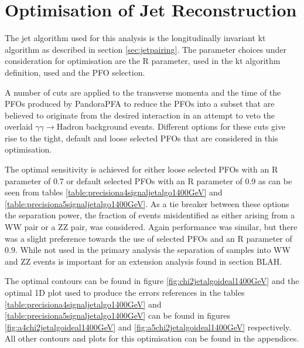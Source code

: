 \section{Optimisation of Jet Reconstruction} \label{sec:optimisationjetalgo}
The jet algorithm used for this analysis is the longitudinally invariant kt algorithm as described in section \ref{sec:jetpairing}.  The parameter choices under consideration for optimisation are the R parameter, used in the kt algorithm definition, used and the PFO selection.  

A number of cuts \cite{arXiv:1209.4039} are applied to the transverse momenta and the time of the PFOs produced by PandoraPFA to reduce the PFOs into a subset that are believed to originate from the desired interaction in an attempt to veto the overlaid $\gamma\gamma \rightarrow \text{Hadron}$ background events.  Different options for these cuts  give rise to the tight, default and loose selected PFOs that are considered in this optimisation.  

The optimal sensitivity is achieved for either loose selected PFOs with an R parameter of 0.7 or default selected PFOs with an R parameter of 0.9 as can be seen from tables \ref{table:precisiona4signaljetalgo1400GeV} and \ref{table:precisiona5signaljetalgo1400GeV}.  As a tie breaker between these options the separation power, the fraction of events misidentified as either arising from a WW pair or a ZZ pair, was considered.  Again performance was similar, but there was a slight preference towards the use of selected PFOs and an R parameter of 0.9.  While not used in the primary analysis the separation of samples into WW and ZZ events is important for an extension analysis found in section BLAH.

The optimal contours can be found in figure \ref{fig:chi2jetalgoideal1400GeV} and the optimal 1D plot used to produce the errors references in the tables \ref{table:precisiona4signaljetalgo1400GeV} and \ref{table:precisiona5signaljetalgo1400GeV} can be found in figures \ref{fig:a4chi2jetalgoideal1400GeV} and \ref{fig:a5chi2jetalgoideal1400GeV} respectively.  All other contours and plots for this optimisation can be found in the appendices.  

